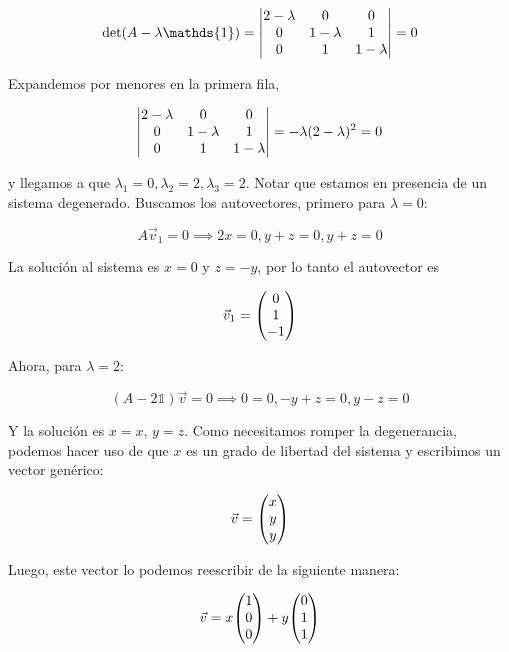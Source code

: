 \documentclass[11pt]{article}
\begin{document}
\begin{equation}
    \det(A - \lambda\mathds{1}) = \mdet{2-\lambda & 0 & 0 \\ 0 & 1-\lambda & 1 \\ 0 & 1 & 1-\lambda} = 0 
\end{equation}

Expandemos por menores en la primera fila,

\begin{equation}
    \mdet{2-\lambda & 0 & 0 \\ 0 & 1-\lambda & 1 \\ 0 & 1 & 1-\lambda} = -\lambda(2-\lambda)^2 = 0
\end{equation}

y llegamos a que $\lambda_1 = 0, \lambda_2 = 2, \lambda_3 = 2$. Notar que estamos en presencia de un sistema degenerado. Buscamos los autovectores, primero para $\lambda = 0$:

\begin{equation}
    A\vec{v}_1 = 0 \implies 2x = 0, y + z = 0, y + z = 0
\end{equation}

La solución al sistema es $x = 0$ y $z = -y$, por lo tanto el autovector es 

\begin{equation}
    \vec{v}_1 = \mqty(0 \\ 1 \\ -1)
\end{equation}

Ahora, para $\lambda = 2$:

\begin{equation}
    (A - 2\mathds{1})\vec{v} = 0 \implies 0 = 0, -y + z = 0, y - z = 0 
\end{equation}

Y la solución es $x = x$, $y = z$. Como necesitamos romper la degenerancia, podemos hacer uso de que $x$ es un grado de libertad del sistema y escribimos un vector genérico:

\begin{equation}
    \vec{v} = \mqty(x \\ y \\ y)
\end{equation}

Luego, este vector lo podemos reescribir de la siguiente manera:

\begin{equation}
    \vec{v} = x\mqty(1 \\ 0 \\ 0) + y\mqty(0 \\ 1 \\ 1)
\end{equation}
\end{document}
